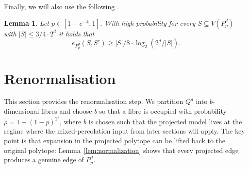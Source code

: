 \documentclass{article}
\newtheorem{lemma}[thm]{Lemma}
\theoremstyle{definition}
\begin{document}
Finally, we will also use the following \cite[Theorem 4.1]{FKSS26}.

\begin{lemma}\label{lem: Wojtek}
    Let $p\in[1-e^{-4},1]$. With high probability for every $S\subseteq V(P_p^{d})$ with $|S|\leq 3/4\cdot 2^d$ it holds that 
    \[e_{P_p^d}(S,S^c)\geq |S|/8\cdot \log_2(2^d/|S|).\]
\end{lemma}

\section{Renormalisation}\label{subsec:renorm}
This section provides the renormalisation step. We partition $Q^d$ into $b$-dimensional fibres and choose $b$ so that a fibre is occupied with probability $\rho=1-(1-p)^{2^b}$, where $b$ is chosen such that the projected model lives at the regime where the mixed-percolation input from later sections will apply. The key point is that expansion in the projected polytope can be lifted back to the original polytope: Lemma~\ref{lem:normalization} shows that every projected edge produces a genuine edge of $P_p^d$.
\end{document}
